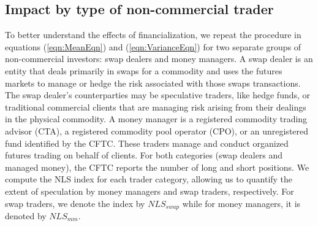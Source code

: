\subsection{Impact by type of non-commercial trader}
To better understand the effects of financialization, we repeat the procedure in equations (\ref{eqn:MeanEqn})  and (\ref{eqn:VarianceEqn})  for two separate groups of non-commercial investors: swap dealers and money managers. 
A swap dealer is an entity that deals primarily in swaps for a commodity and uses the futures markets to manage or hedge the risk associated with those swaps transactions. The swap dealer's counterparties may be speculative traders, like hedge funds, or traditional commercial clients that are managing risk arising from their dealings in the physical commodity.
 A money manager is a registered commodity trading advisor (CTA), a registered commodity pool operator (CPO), or an unregistered fund identified by the CFTC. These traders  manage and conduct organized futures trading on behalf of clients. 
For both categories (swap dealers and managed money), the CFTC reports the number of long and short positions. We compute the NLS index \citep{hedegaard2011margins} for each trader category, allowing us to quantify the extent of speculation by money managers and swap traders, respectively. For swap traders, we denote the index by $NLS_{swap}$ while for money managers, it is denoted by $NLS_{mm}$. 

